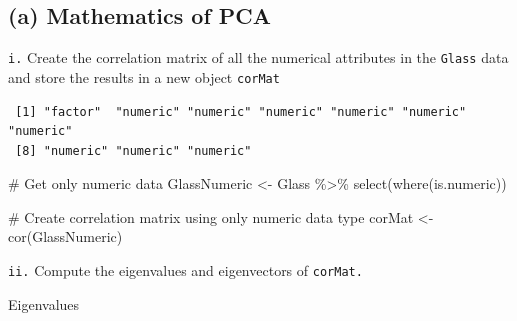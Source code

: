 \documentclass[
  letterpaper,
  DIV=11,
  numbers=noendperiod]{scrartcl}
\newenvironment{Shaded}{}{}
\newcommand{\CommentTok}[1]{\textcolor[rgb]{0.42,0.45,0.49}{#1}}
\newcommand{\FunctionTok}[1]{\textcolor[rgb]{0.44,0.26,0.76}{#1}}
\newcommand{\NormalTok}[1]{\textcolor[rgb]{0.14,0.16,0.18}{#1}}
\newcommand{\OtherTok}[1]{\textcolor[rgb]{0.44,0.26,0.76}{#1}}
\newcommand{\SpecialCharTok}[1]{\textcolor[rgb]{0.00,0.36,0.77}{#1}}
\begin{document}
\hypertarget{a-mathematics-of-pca}{%
\subsection{(a) Mathematics of PCA}\label{a-mathematics-of-pca}}

\texttt{i.} Create the correlation matrix of all the numerical
attributes in the \texttt{Glass} data and store the results in a new
object \texttt{corMat}

\begin{Shaded}
\end{Shaded}

\begin{verbatim}
 [1] "factor"  "numeric" "numeric" "numeric" "numeric" "numeric" "numeric"
 [8] "numeric" "numeric" "numeric"
\end{verbatim}

\begin{Shaded}
\begin{Highlighting}[]
\CommentTok{\# Get only numeric data}
\NormalTok{GlassNumeric }\OtherTok{\textless{}{-}}\NormalTok{ Glass }\SpecialCharTok{\%\textgreater{}\%} \FunctionTok{select}\NormalTok{(}\FunctionTok{where}\NormalTok{(is.numeric))}

\CommentTok{\# Create correlation matrix using only numeric data type}
\NormalTok{corMat }\OtherTok{\textless{}{-}} \FunctionTok{cor}\NormalTok{(GlassNumeric)}
\end{Highlighting}
\end{Shaded}

\texttt{ii.} Compute the eigenvalues and eigenvectors of
\texttt{corMat.}

Eigenvalues

\begin{Shaded}
\end{Shaded}
\end{document}
